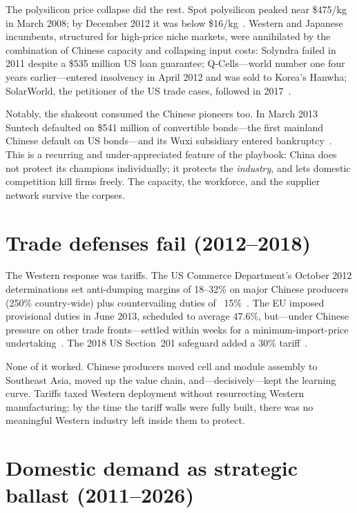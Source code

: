 The polysilicon price collapse did the rest. Spot polysilicon peaked near \$475/kg in March 2008; by December 2012 it was below \$16/kg~\cite{bernreuter}. Western and Japanese incumbents, structured for high-price niche markets, were annihilated by the combination of Chinese capacity and collapsing input costs: Solyndra failed in 2011 despite a \$535 million US loan guarantee; Q-Cells---world number one four years earlier---entered insolvency in April 2012 and was sold to Korea's Hanwha; SolarWorld, the petitioner of the US trade cases, followed in 2017~\cite{solyndra,qcells-insolvency,solarworld}.

Notably, the shakeout consumed the Chinese pioneers too. In March 2013 Suntech defaulted on \$541 million of convertible bonds---the first mainland Chinese default on US bonds---and its Wuxi subsidiary entered bankruptcy~\cite{suntech}. This is a recurring and under-appreciated feature of the playbook: China does not protect its champions individually; it protects the \emph{industry}, and lets domestic competition kill firms freely. The capacity, the workforce, and the supplier network survive the corpses.

\section{Trade defenses fail (2012--2018)}

The Western response was tariffs. The US Commerce Department's October 2012 determinations set anti-dumping margins of 18--32\% on major Chinese producers (250\% country-wide) plus countervailing duties of ~15\%~\cite{us-adcvd}. The EU imposed provisional duties in June 2013, scheduled to average 47.6\%, but---under Chinese pressure on other trade fronts---settled within weeks for a minimum-import-price undertaking~\cite{eu-solar}. The 2018 US Section~201 safeguard added a 30\% tariff~\cite{s201}.

None of it worked. Chinese producers moved cell and module assembly to Southeast Asia, moved up the value chain, and---decisively---kept the learning curve. Tariffs taxed Western deployment without resurrecting Western manufacturing; by the time the tariff walls were fully built, there was no meaningful Western industry left inside them to protect.

\section{Domestic demand as strategic ballast (2011--2026)}

